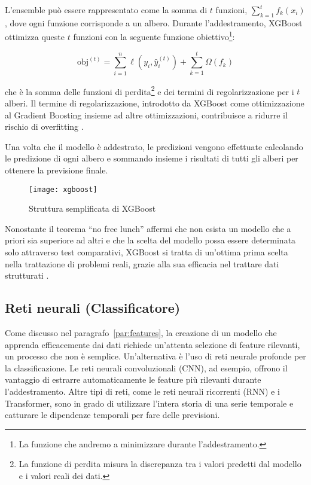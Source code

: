 L'ensemble può essere rappresentato come la somma di $t$ funzioni,
$\sum_{k=1}^{t}f_k(x_i)$, dove ogni funzione corrisponde a un albero. Durante
l'addestramento, XGBoost ottimizza queste $t$ funzioni con la seguente
funzione obiettivo\footnote{La funzione che andremo a minimizzare durante
l'addestramento.}:

$$\text{obj}^{(t)}=\displaystyle\sum_{i=1}^{n}\ell(y_i,\hat{y}_i^{(t)})+\displaystyle\sum_{k=1}^{t}\Omega(f_k)$$

che è la somma delle funzioni di perdita\footnote{La funzione di perdita
misura la discrepanza tra i valori predetti dal modello e i valori reali dei
dati.} e dei termini di regolarizzazione per i $t$ alberi. Il termine di
regolarizzazione, introdotto da XGBoost come ottimizzazione al Gradient
Boosting insieme ad altre ottimizzazioni, contribuisce a ridurre il rischio di
overfitting \cite{chen2016}. 

Una volta che il modello è addestrato, le predizioni vengono effettuate
calcolando le predizione di ogni albero e sommando insieme i risultati di
tutti gli alberi per ottenere la previsione finale.

\begin{figure}[!ht]
    \centering
    \texttt{[image: xgboost]}
    \caption{Struttura semplificata di XGBoost \protect\cite{guo2020}}
    \label{fig:xgboost}
\end{figure}

Nonostante il teorema ``no free lunch'' affermi che non esista un modello che
a priori sia superiore ad altri e che la scelta del modello possa essere
determinata solo attraverso test comparativi, XGBoost si tratta di un'ottima
prima scelta nella trattazione di problemi reali, grazie alla sua efficacia
nel trattare dati strutturati \cite{shwartz2021, chen2016}.

\subsection{Reti neurali (Classificatore)}
\label{sec:nn}

Come discusso nel paragrafo~\ref{par:features}, la creazione di un modello che
apprenda efficacemente dai dati richiede un'attenta selezione di feature
rilevanti, un processo che non è semplice. Un'alternativa è l'uso di reti
neurale profonde per la classificazione. Le reti neurali convoluzionali (CNN),
ad esempio, offrono il vantaggio di estrarre automaticamente le feature più
rilevanti durante l'addestramento. Altre tipi di reti, come le reti neurali
ricorrenti (RNN) e i Transformer, sono in grado di utilizzare l'intera storia
di una serie temporale e catturare le dipendenze temporali per fare delle
previsioni.

